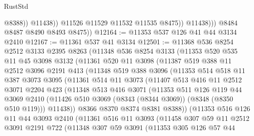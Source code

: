 \begin{lexlean}{RustStd}
\begin{coremodule}
                          @8388))
                      @11438))
                  @11526
                  @11529
                  @11532
                  @11535
                  @8475))
              @11438)))
        @8484
        @8487
        @8490
        @8493
        @8475))
@12164 := @11353 @537 @126 @41 @44 @3134 @2410
@12167 := @11361 @537 @41 @3134
@12501 := @11368
    @536
    @8254
    @2512
    @3133
    @2395
    @8263
    (@11348
      @536
      @8254
      @3133
      (@11353
        @520
        @535
        @11
        @45
        @3098
        @3132
        (@11361
          @520
          @11
          @3098
          (@11387
            @519
            @388
            @11
            @2512
            @3096
            @2191
            @413
            (@11348
              @519
              @388
              @3096
              (@11353
                @514
                @518
                @11
                @387
                @3073
                @3095
                (@11361
                  @514
                  @11
                  @3073
                  (@11407
                    @513
                    @416
                    @11
                    @2512
                    @3071
                    @2204
                    @423
                    (@11348
                      @513
                      @416
                      @3071
                      (@11353
                        @511
                        @126
                        @119
                        @44
                        @3069
                        @2410
                        (@11426 @510 @3069 (@8343 (@8344 @3069)) (@8348 (@8350 @510 @119)))
                        @11438))
                    @8366
                    @8370
                    @8374
                    @8381
                    @8388))
                (@11353
                  @516
                  @126
                  @11
                  @44
                  @3093
                  @2410
                  (@11361
                    @516
                    @11
                    @3093
                    (@11458
                      @307
                      @59
                      @11
                      @2512
                      @3091
                      @2191
                      @722
                      (@11348
                        @307
                        @59
                        @3091
                        (@11353
                          @305
                          @126
                          @57
                          @44

\end{coremodule}
\end{lexlean}
